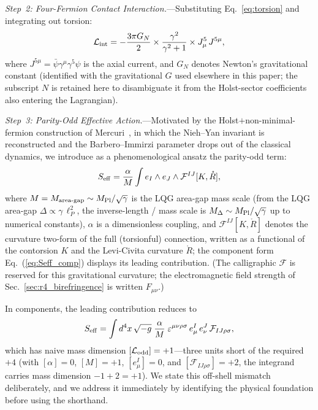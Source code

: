 \documentclass[aps,prd,twocolumn,superscriptaddress,showpacs,preprintnumbers,nofootinbib,longbibliography,floatfix]{revtex4-2}
\newcommand{\MPl}{M_{\rm Pl}}
\begin{document}
\textit{Step~2: Four-Fermion Contact Interaction.}---Substituting Eq.~\eqref{eq:torsion}
and integrating out torsion:
\begin{equation}\label{eq:4fermi}
\mathcal{L}_{\rm int} = -\frac{3\pi G_N}{2}\times \frac{\gamma^2}{\gamma^2+1}\times J^5_{\mu}\,J^{5\mu},
\end{equation}
where $J^{5\mu}=\bar{\psi}\gamma^{\mu}\gamma^5\psi$ is the axial current, and
$G_N$ denotes Newton's gravitational constant (identified with the gravitational
$G$ used elsewhere in this paper; the subscript $N$ is retained here to
disambiguate it from the Holst-sector coefficients also entering the Lagrangian).

\textit{Step~3: Parity-Odd Effective Action.}---Motivated by the
Holst$+$non-minimal-fermion construction of Mercuri~\cite{Mercuri2009},
in which the Nieh--Yan invariant is reconstructed and the
Barbero--Immirzi parameter drops out of the classical dynamics, we
introduce as a phenomenological ansatz the parity-odd term:
\begin{equation}\label{eq:Seff}
S_{\rm eff} = \frac{\alpha}{M}\int e_I\wedge e_J\wedge \mathcal{F}^{IJ}[K,\mathring{R}],
\end{equation}
where $M = M_{\rm area\text{-}gap}\sim\MPl/\sqrt{\gamma}$ is the LQG area-gap
mass scale (from the LQG area-gap $\Delta \propto \gamma\,\ell_P^2$, the
inverse-length / mass scale is $M_\Delta \sim M_{\rm Pl}/\sqrt{\gamma}$ up
to numerical constants), $\alpha$ is a dimensionless coupling, and
$\mathcal{F}^{IJ}[K,\mathring{R}]$ denotes the curvature two-form of the
full (torsionful) connection, written as a functional of the contorsion
$K$ and the Levi-Civita curvature $\mathring{R}$; the component form
Eq.~(\ref{eq:Seff_comp}) displays its leading contribution. (The
calligraphic $\mathcal{F}$ is reserved for this gravitational curvature;
the electromagnetic field strength of Sec.~\ref{sec:r4_birefringence} is
written $F_{\mu\nu}$.)

In components, the leading contribution reduces to
\begin{equation}\label{eq:Seff_comp}
S_{\rm eff} = \int d^4x\,\sqrt{-g}\;\frac{\alpha}{M}\;\varepsilon^{\mu\nu\rho\sigma}\,e^I_\mu\,e^J_\nu\,\mathcal{F}_{IJ\rho\sigma},
\end{equation}
which has naive mass dimension $[\mathcal{L}_{\rm odd}] = +1$---three units
short of the required $+4$ (with $[\alpha]=0$, $[M]=+1$, $[e^I_\mu]=0$, and
$[\mathcal{F}_{IJ\rho\sigma}]=+2$, the integrand carries mass dimension
$-1+2=+1$). We state this off-shell mismatch deliberately, and we address it
immediately by identifying the physical foundation before using the shorthand.
\end{document}
